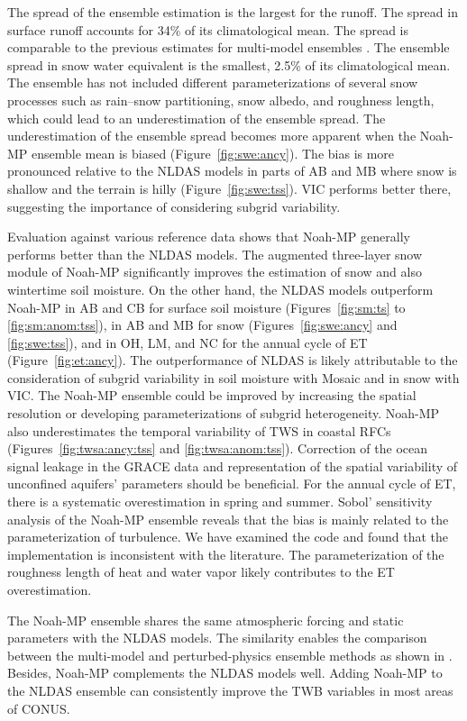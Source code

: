 \documentclass[essd, manuscript]{copernicus}
\begin{document}
The spread of the ensemble estimation is the largest for the runoff. The spread in surface runoff accounts for 34\% of its climatological mean. The spread is comparable to the previous estimates for multi-model ensembles \citep{dirmeyer2006BAMS}. The ensemble spread in snow water equivalent is the smallest, 2.5\% of its climatological mean. The ensemble has not included different parameterizations of several snow processes such as rain--snow partitioning, snow albedo, and roughness length, which could lead to an underestimation of the ensemble spread. The underestimation of the ensemble spread becomes more apparent when the Noah-MP ensemble mean is biased (Figure~\ref{fig:swe:ancy}). The bias is more pronounced relative to the NLDAS models in parts of AB and MB where snow is shallow and the terrain is hilly (Figure~\ref{fig:swe:tss}). VIC performs better there, suggesting the importance of considering subgrid variability.

Evaluation against various reference data shows that Noah-MP generally performs better than the NLDAS models. The augmented three-layer snow module of Noah-MP significantly improves the estimation of snow and also wintertime soil moisture. On the other hand, the NLDAS models outperform Noah-MP in AB and CB for surface soil moisture (Figures~\ref{fig:sm:ts} to \ref{fig:sm:anom:tss}), in AB and MB for snow (Figures~\ref{fig:swe:ancy} and \ref{fig:swe:tss}), and in OH, LM, and NC for the annual cycle of ET (Figure~\ref{fig:et:ancy}). The outperformance of NLDAS is likely attributable to the consideration of subgrid variability in soil moisture with Mosaic and in snow with VIC\@. The Noah-MP ensemble could be improved by increasing the spatial resolution or developing parameterizations of subgrid heterogeneity. Noah-MP also underestimates the temporal variability of TWS in coastal RFCs (Figures~\ref{fig:twsa:ancy:tss} and \ref{fig:twsa:anom:tss}). Correction of the ocean signal leakage in the GRACE data and representation of the spatial variability of unconfined aquifers' parameters should be beneficial. For the annual cycle of ET, there is a systematic overestimation in spring and summer. Sobol' sensitivity analysis of the Noah-MP ensemble reveals that the bias is mainly related to the parameterization of turbulence. We have examined the code and found that the implementation is inconsistent with the literature. The parameterization of the roughness length of heat and water vapor likely contributes to the ET overestimation.

The Noah-MP ensemble shares the same atmospheric forcing and static parameters with the NLDAS models. The similarity enables the comparison between the multi-model and perturbed-physics ensemble methods as shown in \citet{fei2021WRR}. Besides, Noah-MP complements the NLDAS models well. Adding Noah-MP to the NLDAS ensemble can consistently improve the TWB variables in most areas of CONUS\@.
\end{document}

